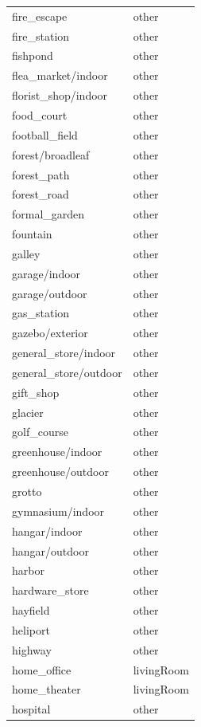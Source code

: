 \begin{table}[h!]
\begin{tabular}{| l | l |}
		fire\_escape &        other \\
		fire\_station &        other \\
		fishpond &        other \\
		flea\_market/indoor &        other \\
		florist\_shop/indoor &        other \\
		food\_court &        other \\
		football\_field &        other \\
		forest/broadleaf &        other \\
		forest\_path &        other \\
		forest\_road &        other \\
		formal\_garden &        other \\
		fountain &        other \\
		galley &        other \\
		garage/indoor &        other \\
		garage/outdoor &        other \\
		gas\_station &        other \\
		gazebo/exterior &        other \\
		general\_store/indoor &        other \\
		general\_store/outdoor &        other \\
		gift\_shop &        other \\
		glacier &        other \\
		golf\_course &        other \\
		greenhouse/indoor &        other \\
		greenhouse/outdoor &        other \\
		grotto &        other \\
		gymnasium/indoor &        other \\
		hangar/indoor &        other \\
		hangar/outdoor &        other \\
		harbor &        other \\
		hardware\_store &        other \\
		hayfield &        other \\
		heliport &        other \\
		highway &        other \\
		home\_office &   livingRoom \\
		home\_theater &   livingRoom \\
		hospital &        other \\

\end{tabular}
\end{table}
